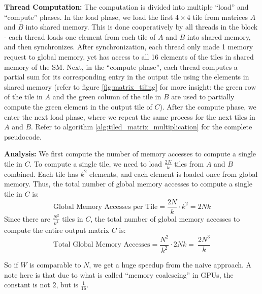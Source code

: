 \documentclass{article}
\begin{document}
\textbf{Thread Computation:} The computation is divided into multiple ``load'' and ``compute'' phases. In the load phase, we load the first $4 \times 4$ tile from matrices $A$ and $B$ into shared memory. This is done cooperatively by all threads in the block - each thread loads one element from each tile of $A$ and $B$ into shared memory, and then synchronizes. After synchronization, each thread only made 1 memory request to global memory, yet has access to all 16 elements of the tiles in shared memory of the SM. Next, in the ``compute phase'', each thread computes a partial sum for its corresponding entry in the output tile using the elements in shared memory (refer to figure \ref{fig:matrix_tiling} for more insight: the green row of the tile in $A$ and the green column of the tile in $B$ are used to partially compute the green element in the output tile of $C$). After the compute phase, we enter the next load phase, where we repeat the same process for the next tiles in $A$ and $B$. Refer to algorithm \ref{alg:tiled_matrix_multiplication} for the complete pseudocode.

\textbf{Analysis:} We first compute the number of memory accesses to compute a single tile in $C$. To compute a single tile, we need to load $\frac{2N}{k}$ tiles from $A$ and $B$ combined. Each tile has $k^2$ elements, and each element is loaded once from global memory. Thus, the total number of global memory accesses to compute a single tile in $C$ is:
\[ \text{Global Memory Accesses per Tile} = \frac{2N}{k} \cdot k^2 = 2Nk \]
Since there are $\frac{N^2}{k^2}$ tiles in $C$, the total number of global memory accesses to compute the entire output matrix $C$ is:
\[ \text{Total Global Memory Accesses} = \frac{N^2}{k^2} \cdot 2Nk = \ \frac{2N^3}{k} \]

So if $W$ is comparable to $N$, we get a huge speedup from the naive approach. A note here is that due to what is called ``memory coalescing'' in GPUs, the constant is not $2$, but is $\frac{1}{16}$.
\end{document}
